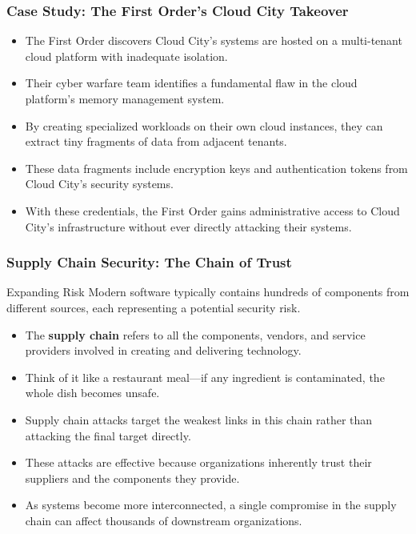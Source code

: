 \documentclass{beamer}
\begin{document}
\begin{frame}
    \frametitle{Case Study: The First Order's Cloud City Takeover}
    
    \begin{itemize}
        \item The First Order discovers Cloud City's systems are hosted on a multi-tenant cloud platform with inadequate isolation.
        \item Their cyber warfare team identifies a fundamental flaw in the cloud platform's memory management system.
        \item By creating specialized workloads on their own cloud instances, they can extract tiny fragments of data from adjacent tenants.
        \item These data fragments include encryption keys and authentication tokens from Cloud City's security systems.
        \item With these credentials, the First Order gains administrative access to Cloud City's infrastructure without ever directly attacking their systems.
    \end{itemize}
\end{frame}

\begin{frame}
    \frametitle{Supply Chain Security: The Chain of Trust}
    
    \begin{alertblock}{Expanding Risk}
        Modern software typically contains hundreds of components from different sources, each representing a potential security risk.
    \end{alertblock}
    
    \begin{itemize}
        \item The \textbf{supply chain} refers to all the components, vendors, and service providers involved in creating and delivering technology.
        \item Think of it like a restaurant meal—if any ingredient is contaminated, the whole dish becomes unsafe.
        \item Supply chain attacks target the weakest links in this chain rather than attacking the final target directly.
        \item These attacks are effective because organizations inherently trust their suppliers and the components they provide.
        \item As systems become more interconnected, a single compromise in the supply chain can affect thousands of downstream organizations.
    \end{itemize}
\end{frame}
\end{document}
